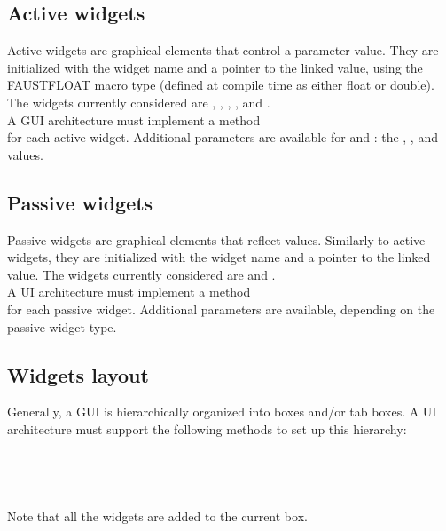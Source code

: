 \subsection{Active widgets}
\label{awidget}
Active widgets are graphical elements that control a parameter value. They are initialized with the widget name and a pointer to the linked value, using the FAUSTFLOAT macro type (defined at compile time as either float or double).
The widgets currently considered are , , , , and . \\
A GUI architecture must implement a method \\
 for each active widget.
Additional parameters are available for  and : the , ,  and  values.

\subsection{Passive widgets}
\label{pwidget}
Passive widgets are graphical elements that reflect values. Similarly to active widgets, they are initialized with the widget name and a pointer to the linked value.
The widgets currently considered are  and . \\
A UI architecture must implement a method \\
 for each passive widget.
Additional parameters are available, depending on the passive widget type.

\subsection{Widgets layout}
\label{wlayout}
Generally, a GUI is hierarchically organized into boxes and/or tab boxes. 
A UI architecture must support the following methods to set up this hierarchy: \\
\htab{} \\
\htab{} \\
\htab{} \\
\htab{} \\
Note that all the widgets are added to the current box.

